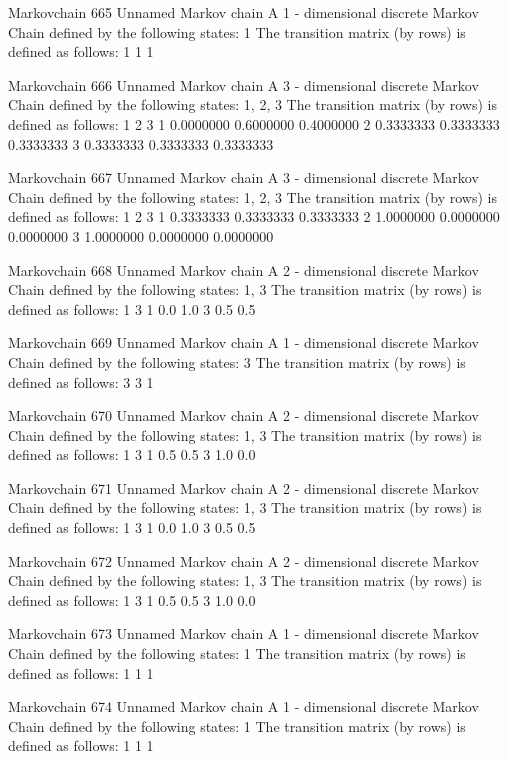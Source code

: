 \documentclass[
  nojss]{jss}
\begin{document}
\begin{CodeChunk}
\begin{CodeOutput}
Markovchain  665 
Unnamed Markov chain 
 A  1 - dimensional discrete Markov Chain defined by the following states: 
 1 
 The transition matrix  (by rows)  is defined as follows: 
  1
1 1

Markovchain  666 
Unnamed Markov chain 
 A  3 - dimensional discrete Markov Chain defined by the following states: 
 1, 2, 3 
 The transition matrix  (by rows)  is defined as follows: 
          1         2         3
1 0.0000000 0.6000000 0.4000000
2 0.3333333 0.3333333 0.3333333
3 0.3333333 0.3333333 0.3333333

Markovchain  667 
Unnamed Markov chain 
 A  3 - dimensional discrete Markov Chain defined by the following states: 
 1, 2, 3 
 The transition matrix  (by rows)  is defined as follows: 
          1         2         3
1 0.3333333 0.3333333 0.3333333
2 1.0000000 0.0000000 0.0000000
3 1.0000000 0.0000000 0.0000000

Markovchain  668 
Unnamed Markov chain 
 A  2 - dimensional discrete Markov Chain defined by the following states: 
 1, 3 
 The transition matrix  (by rows)  is defined as follows: 
    1   3
1 0.0 1.0
3 0.5 0.5

Markovchain  669 
Unnamed Markov chain 
 A  1 - dimensional discrete Markov Chain defined by the following states: 
 3 
 The transition matrix  (by rows)  is defined as follows: 
  3
3 1

Markovchain  670 
Unnamed Markov chain 
 A  2 - dimensional discrete Markov Chain defined by the following states: 
 1, 3 
 The transition matrix  (by rows)  is defined as follows: 
    1   3
1 0.5 0.5
3 1.0 0.0

Markovchain  671 
Unnamed Markov chain 
 A  2 - dimensional discrete Markov Chain defined by the following states: 
 1, 3 
 The transition matrix  (by rows)  is defined as follows: 
    1   3
1 0.0 1.0
3 0.5 0.5

Markovchain  672 
Unnamed Markov chain 
 A  2 - dimensional discrete Markov Chain defined by the following states: 
 1, 3 
 The transition matrix  (by rows)  is defined as follows: 
    1   3
1 0.5 0.5
3 1.0 0.0

Markovchain  673 
Unnamed Markov chain 
 A  1 - dimensional discrete Markov Chain defined by the following states: 
 1 
 The transition matrix  (by rows)  is defined as follows: 
  1
1 1

Markovchain  674 
Unnamed Markov chain 
 A  1 - dimensional discrete Markov Chain defined by the following states: 
 1 
 The transition matrix  (by rows)  is defined as follows: 
  1
1 1


\end{CodeOutput}
\end{CodeChunk}
\end{document}
